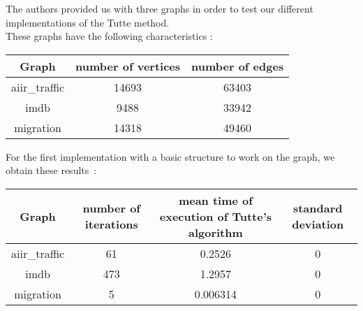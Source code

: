 
The authors provided us with three graphs in order to test our
different implementations of the Tutte method.\\

These graphs have the following characteristics :

\begin{center}
\begin{tabular}{|c|c|c|}
\hline
Graph & number of vertices & number of edges \\
\hline
aiir\_traffic & 14693 & 63403\\
imdb & 9488 & 33942\\
migration & 14318 & 49460\\
\hline
\end{tabular}
\end{center}


For the first implementation with a basic structure to
work on the graph, we obtain these results~:

\begin{center}
\begin{tabular}{|c|c|c|c|}
\hline
Graph & number of iterations & mean time of execution of Tutte's algorithm & standard deviation\\
\hline
aiir\_traffic & 61 & 0.2526 & 0\\
imdb & 473 & 1.2957 & 0\\
migration & 5 & 0.006314 & 0\\
\hline

\end{tabular}
\end{center}

